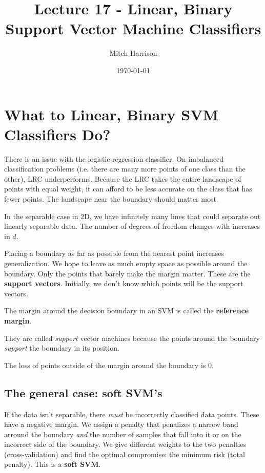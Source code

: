\documentclass[titlepage, 12pt, leqno]{article}
\title{\Huge{Lecture 17 - Linear, Binary Support Vector Machine Classifiers}}
\author{\large{Mitch Harrison}}
\date{\today}
\begin{document}
\setlength{\parskip}{1\baselineskip}
\setlength{\parindent}{15pt}
\maketitle
\tableofcontents
\newpage


\section{What to Linear, Binary SVM Classifiers Do?}

There is an issue with the logistic regression classifier. On imbalanced
classification problems (i.e. there are many more points of one class than the
other), LRC underperforms. Because the LRC takes the entire landscape of points
with equal weight, it can afford to be less accurate on the class that has
fewer points. The landscape near the boundary should matter most.

In the separable case in 2D, we have infinitely many lines that could separate
out linearly separable data. The number of degrees of freedom changes with
increases in $d$.

Placing a boundary as far as possible from the nearest point increases
generalization. We hope to leave as much empty space as possible around the
boundary. Only the points that barely make the margin matter. These are the
\textbf{support vectors}. Initially, we don't know which points will be the 
support vectors.
\begin{definition}
    The margin around the decision boundary in an SVM is called the
    \textbf{reference margin}.
\end{definition}

\begin{note}
    They are called \textit{support} vector machines because the points 
    around the boundary \textit{support} the boundary in its position.
\end{note}
The loss of points outside of the margin around the boundary is 0.

\subsection{The general case: soft SVM's}
If the data isn't separable, there \textit{must} be incorrectly classified
data points. These have a negative margin. We assign a penalty that penalizes
a narrow band arround the boundary \textit{and} the number of samples that fall
into it or on the incorrect side of the boundary. We give different weights to
the two penalties (cross-validation) and find the optimal compromise: the
minimum risk (total penalty). This is a \textbf{soft SVM}.
\end{document}
